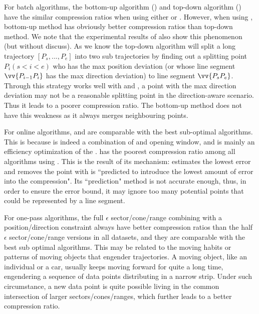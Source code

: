 For batch algorithms, the bottom-up algorithm (\tpa) and top-down algorithm (\dpa) have the similar compression ratios when using either \ped or \sed. However, when using \dad, bottom-up method has obviously better compression ratios than top-down method. We note that the experimental results of \cite{Long:Direction} also show this phenomenon (but without discuss). As we know the top-down algorithm will split a long trajectory $[P_s, ..., P_e]$ into two sub trajectories by finding out a splitting point $P_i (s<i<e)$ who has the max position deviation (or whose line segment $\vv{P_{i-1}P_{i}}$ has the max direction deviation) to line segment $\vv{P_sP_{e}}$. Through this strategy works well with \ped and \sed, a point with the max direction deviation may not be a reasonable splitting point in the direction-aware scenario. Thus it leads to a poorer compression ratio. The bottom-up method does not have this weakness as it always merges neighbouring points.



For online algorithms, \bqsa and \opwa are comparable with the best sub-optimal algorithms. This is because \opwa is indeed a combination of \dpa and opening window, and \bqsa is mainly an efficiency optimization of the \opwa.
\squishe has the poorest compression ratio among all algorithms using \sed. This is the result of its mechanism: \squishe estimates the lowest \sed error and removes the point with is ``predicted to introduce the lowest amount of error into the compression"\cite{Muckell:SQUISH}. Its ``prediction" method is not accurate enough, thus, in order to ensure the error bound, it may ignore too many potential points that could be represented by a line segment.

For one-pass algorithms, the full $\epsilon$ sector/cone/range combining with a position/direction constraint always have better compression ratios than the half $\epsilon$ sector/cone/range versions in all datasets, and they are comparable with the best sub optimal algorithms.
This may be related to the moving habits or patterns of moving objects that engender trajectories.
A moving object, like an individual or a car, usually keeps moving forward for quite a long time, engendering a sequence of data points distributing in a narrow strip. Under such circumstance, a new data point is quite possible living in the common intersection of larger sectors/cones/ranges, which further leads to a better compression ratio.



